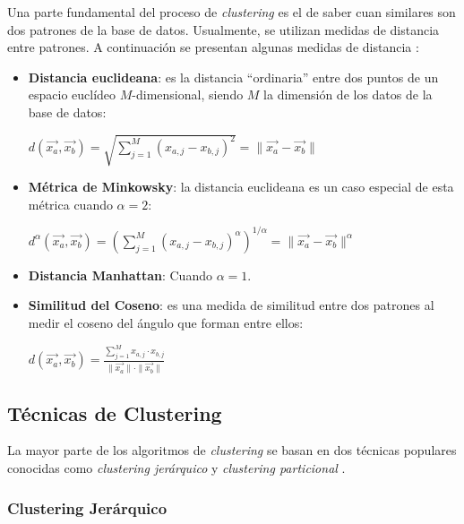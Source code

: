 Una parte fundamental del proceso de \emph{clustering} es el de saber cuan
similares son dos patrones de la base de datos. Usualmente, se utilizan medidas
de distancia entre patrones. A continuación se presentan algunas medidas de
distancia \cite{PSO_0}:
\begin{itemize}
    \item \textbf{Distancia euclideana}: es la distancia ``ordinaria'' entre dos
puntos de un espacio euclídeo $M$-dimensional, siendo $M$ la dimensión de los
datos de la base de datos:
\begin{center}
    $d(\overrightarrow{x_a}, \overrightarrow{x_b}) = \displaystyle\sqrt{\displaystyle\sum_{j = 1}^{M} (x_{a,j} - x_{b,j})^2} = \|\overrightarrow{x_a} - \overrightarrow{x_b}\|$
\end{center}
    \item \textbf{Métrica de Minkowsky}: la distancia euclideana es un caso
especial de esta métrica cuando $\alpha = 2$:
\begin{center}
    $d^{\alpha}(\overrightarrow{x_a}, \overrightarrow{x_b}) = \left(\displaystyle\sum_{j = 1}^{M} (x_{a,j} - x_{b,j})^{\alpha}\right)^{1/\alpha} = \|\overrightarrow{x_a} - \overrightarrow{x_b}\|^{\alpha}$
\end{center}
    \item \textbf{Distancia Manhattan}: Cuando $\alpha = 1$. 
    \item \textbf{Similitud del Coseno}: es una medida de similitud entre dos
patrones al medir el coseno del ángulo que forman entre ellos:
\begin{center}
    $d(\overrightarrow{x_a}, \overrightarrow{x_b}) = \displaystyle\frac{\displaystyle\sum_{j = 1}^{M} x_{a, j} \cdot x_{b, j}}{\|\overrightarrow{x_a}\| \cdot \|\overrightarrow{x_b}\|}$
\end{center}
\end{itemize}

\subsection{Técnicas de Clustering}

    La mayor parte de los algoritmos de \emph{clustering} se basan en dos
técnicas populares conocidas como  \emph{clustering jerárquico} y
\emph{clustering particional} \cite{PSO_0}.

\subsubsection{Clustering Jerárquico}

